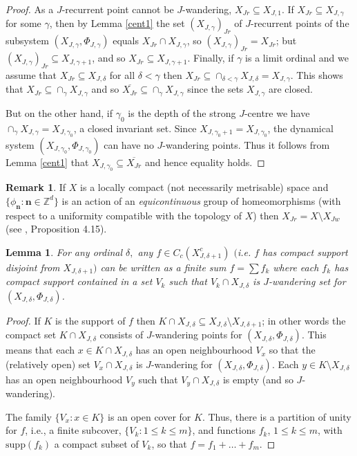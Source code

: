 \documentclass[12pt]{amsart}
\newtheorem{lemma}[theorem]{Lemma}
\theoremstyle{definition}
\newtheorem*{remark}{Remark}
\newcommand{\bbZ}{\mathbb{Z}}
\newcommand{\bon}{\mathbf{n}}
\begin{document}
\begin{proof}
As a $J$-recurrent point cannot be $J$-wandering,
$X_{Jr}\subseteq X_{J,1}$. If $X_{Jr}\subseteq X_{J,\gamma}$ for some
$\gamma$, then by Lemma \ref{cent1} the set $(X_{J,\gamma})_{Jr}$ of
$J$-recurrent points of the subsystem
$(X_{J,\gamma},\Phi_{J,\gamma})$ equals $X_{Jr}\cap X_{J,\gamma}$, so
$(X_{J,\gamma})_{Jr}=X_{Jr}$; but $(X_{J,\gamma})_{Jr}\subseteq
X_{J,\gamma+1}$, and so $X_{Jr}\subseteq X_{J,\gamma+1}$. Finally, if
$\gamma$ is a limit ordinal and we assume that $X_{Jr}\subseteq
X_{J,\delta}$ for all $\delta<\gamma$ then
$X_{Jr}\subseteq\cap_{\delta<\gamma}X_{J,\delta}=X_{J,\gamma}$. This
shows that $X_{Jr}\subseteq\cap_{\gamma}X_{J,\gamma}$ and so
$\overline{X_{Jr}}\subseteq \cap_{\gamma}X_{J,\gamma}$ since the sets
$X_{J,\gamma}$ are closed.

But on the other hand, if $\gamma_0$ is the depth of the strong
$J$-centre we have $\cap_{\gamma}X_{J,\gamma}=X_{J,\gamma_0}$, a closed
invariant set. Since $X_{J,\gamma_0+1}=X_{J,\gamma_0}$, the dynamical
system $(X_{J,\gamma_0},\Phi_{J,\gamma_0})$ can have no $J$-wandering points.
Thus it follows from Lemma \ref{cent1} that
$X_{J,\gamma_0}\subseteq\overline{X_{Jr}}$ and hence equality holds.
\end{proof}

\begin{remark}
If $X$ is a locally compact (not necessarily metrisable) space
and $\{ \phi_{\bon}: \bon \in \bbZ^d \}$ is an action of an
\emph{equicontinuous} group of homeomorphisms (with respect to a uniformity
compatible with the topology of $X$) then $X_{Jr}=X\setminus X_{Jw}$
(see \cite{amanou}, Proposition 4.15).
\end{remark}

\begin{lemma}
\label{prad4} For any ordinal $\delta ,$ any $f\in
C_{c}(X_{J,\delta +1}^{c})$ $($i.e. $f$ has compact support
disjoint from $X_{J,\delta +1})$ can be written as a \emph{finite}
sum $f=\sum f_{k}$ where each $f_{k}$ has compact support
contained in a set $V_k$ such that $V_k \cap
X_{J,\delta }$ is $J$-wandering set for $(X_{J,\delta },\Phi
_{J,\delta })$.
\end{lemma}

\begin{proof}
If $K$ is the support of $f$ then $K\cap X_{J,\delta}\subseteq
X_{J,\delta }\setminus X_{J,\delta +1}$; in other words the
compact set $K\cap X_{J,\delta }$ consists of $J$-wandering
points for $(X_{J,\delta },\Phi _{J,\delta })$. This means that each
$x\in K\cap X_{J,\delta }$ has an open neighbourhood $V_{x}$ so that
the (relatively open) set $V_{x}\cap X_{J,\delta }$ is
$J$-wandering for $(X_{J,\delta },\Phi _{J,\delta })$.
Each $y \in K\setminus X_{J,\delta}$ has an open neighbourhood
$V_y$ such that $V_y\cap X_{J,\delta}$ is empty (and so $J$-wandering).

The family $\{V_x:x\in K\}$ is an open cover for $K$. 
Thus, there is a partition of unity for $f$, i.e., a finite subcover,
$\{V_k:1\leq k\leq m\}$, and functions $f_k$, $1 \le k \le m$,
with $\mathrm{supp} (f_k) $ a compact subset of $V_k$, so that
$f=f_1+\ldots +f_m$.
\end{proof}
\end{document}
